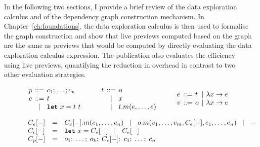 \documentclass[fleqn,11pt]{report}
\newcommand{\lsep}[0]{\;\; | \;\;}
\newcommand{\kvd}[1]{\textnormal{\ttfamily\bfseries #1}}
\newcommand{\narrow}[1]{\hspace{-0.6em}#1\hspace{-0.6em}}
\theoremstyle{definition}
\begin{document}
In the following two sections, I provide a brief review of the data exploration calculus and of
the dependency graph construction mechanism. In Chapter~\ref{ch:foundations}, the data exploration
calculus is then used to formalise the graph construction and show that live previews computed
based on the graph are the same as previews that would be computed by directly evaluating the
data exploration calculus expression. The publication also evaluates the efficiency using live
previews, quantifying the reduction in overhead in contrast to two other evaluation strategies.

\begin{figure}
\raggedright
\hspace{0.5em}{\sffamily Programs, commands, terms, expressions and values}
%
\begin{equation*}
\begin{array}{lcl}
p &\narrow{::=}& c_1; \ldots; c_n\\
c &\narrow{::=}& t\\
  &\narrow{|}& \kvd{let}~x = t~t\\
\end{array}
\qquad
\begin{array}{lcl}
t &\narrow{::=}& o \\
  &\narrow{|}& x\\
  &\narrow{|}& t.m(e, \ldots, e)
\end{array}
\qquad
\begin{array}{lclcl}
e &\narrow{::=}& t &\narrow{|}& \lambda x\rightarrow e\\
v &\narrow{::=}& o &\narrow{|}& \lambda x\rightarrow e\\
\end{array}
\end{equation*}

%
\hspace{0.5em}{\sffamily Evaluation contexts of expressions}
%
\begin{equation*}
\begin{array}{lcl}
C_e[-] &=& C_e[-].m(e_1, \ldots, e_n) ~\lsep~ o.m(v_1, \ldots, v_{m}, C_e[-], e_1,\ldots , e_n) ~\lsep~ -\\
C_c[-] &=& \kvd{let}~x = C_e[-] ~\lsep~ C_e[-]\\
C_p[-] &=& o_1;\; \ldots;\; o_{k};\; C_c[-];\; c_{1};\; \ldots;\; c_n\\
\end{array}
\end{equation*}


\end{figure}
\end{document}
